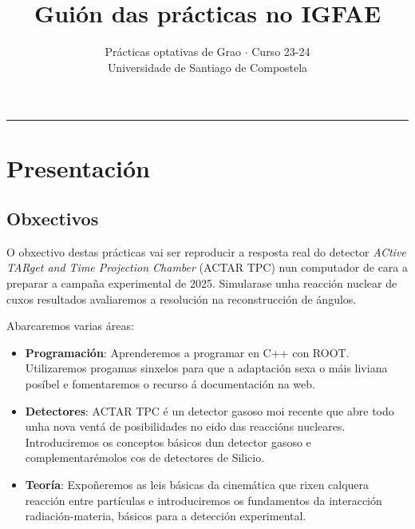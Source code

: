 \documentclass[11pt, a4paper]{article}
\title{\textbf{Guión das prácticas no IGFAE}}
\author{%
\small{Prácticas optativas de Grao $\cdot$ Curso 23-24}\\
\small{Universidade de Santiago de Compostela}}
\date{\empty}%
\begin{document}
\begin{minipage}{0.48\linewidth}
    \maketitle
\end{minipage}\hfill
\begin{minipage}{0.48\linewidth}
    \tableofcontents
\end{minipage}

\noindent\rule{\textwidth}{1pt}
\section{Presentación}
\subsection{Obxectivos}
O obxectivo destas prácticas vai ser reproducir a resposta real do detector \textit{ACtive TARget and Time Projection Chamber} (ACTAR TPC) nun computador de cara a preparar a campaña experimental de 2025. Simularase unha reacción nuclear de cuxos resultados avaliaremos a resolución na reconstrucción de ángulos.

Abarcaremos varias áreas:
\begin{itemize}
    \item \textbf{Programación}: Aprenderemos a programar en C++ con ROOT. Utilizaremos progamas sinxelos para que a adaptación sexa o máis liviana posíbel e fomentaremos o recurso á documentación na web.
    \item \textbf{Detectores}: ACTAR TPC é un detector gasoso moi recente que abre todo unha nova ventá de posibilidades no eido das reaccións nucleares. Introduciremos os conceptos básicos dun detector gasoso e complementarémolos cos de detectores de Silicio.
    \item \textbf{Teoría}: Expoñeremos as leis básicas da cinemática que rixen calquera reacción entre partículas e introduciremos os fundamentos da interacción radiación-materia, básicos para a detección experimental.
\end{itemize}
\end{document}
